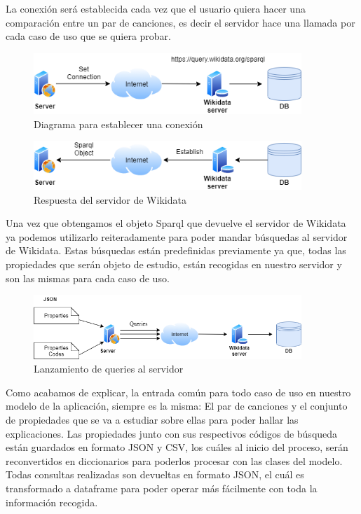 La conexión será establecida cada vez que el usuario quiera hacer una comparación entre un par de canciones, es decir el servidor hace una llamada por cada caso de uso que se quiera probar.\\

\begin{figure}[h!]
	\centering
	\includegraphics[width = 0.9\textwidth]{Imagenes/Bitmap/setConnection.png}
	\caption{Diagrama para establecer una conexión}
	\label{fig:diagramaConexion}
\end{figure}

\begin{figure}[h!]
	\centering
	\includegraphics[width = 0.9\textwidth]{Imagenes/Bitmap/conexionReturn.png}
	\caption{Respuesta del servidor de Wikidata}
	\label{fig:respuestaWikidata}
\end{figure}

Una vez que obtengamos el objeto Sparql que devuelve el servidor de Wikidata ya podemos utilizarlo reiteradamente para poder mandar búsquedas al servidor de Wikidata. Estas búsquedas están predefinidas previamente ya que, todas las propiedades que serán objeto de estudio, están recogidas en nuestro servidor y son las mismas para cada caso de uso. 
\\

\begin{figure}[h!]
	\centering
	\includegraphics[width = 0.9\textwidth]{Imagenes/Bitmap/conexion.png}
	\caption{Lanzamiento de queries al servidor}
	\label{fig:queriesServidor}
\end{figure}

Como acabamos de explicar, la entrada común para todo caso de uso en nuestro modelo de la aplicación, siempre es la misma: El par de canciones y el conjunto de propiedades que se va a estudiar sobre ellas para poder hallar las explicaciones. Las propiedades junto con sus respectivos códigos de búsqueda están guardados en formato JSON y CSV, los cuáles al inicio del proceso, serán reconvertidos en diccionarios para poderlos procesar con las clases del modelo. Todas consultas realizadas son devueltas en formato JSON, el cuál es transformado a dataframe para poder operar más fácilmente con toda la información recogida.\\

